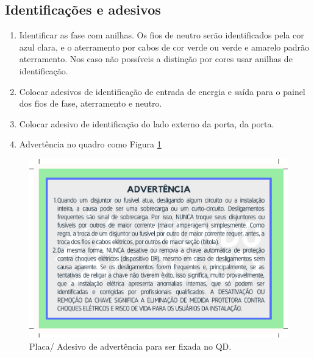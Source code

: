 \subsection{Identificações e adesivos}
\begin{enumerate}
\item Identificar as fase com anilhas. Os fios de neutro serão identificados pela cor azul clara, e o aterramento por cabos de cor verde ou verde e amarelo padrão aterramento. Nos caso não possíveis a distinção por cores usar anilhas de identificação.
\item Colocar adesivos de identificação de entrada de energia e saída para o painel dos fios de fase, aterramento e neutro.
\item  Colocar adesivo de identificação do lado externo da porta, da porta.
\item Advertência no quadro como Figura \ref{fig:advQD}
\end{enumerate}


\begin{figure}[ht]
    \centering
    \includegraphics[scale=0.5]{image/EtiqAdvQD.pdf}
    \caption{Placa/ Adesivo de advertência para ser fixada no QD.}
    \label{fig:advQD}
\end{figure}
